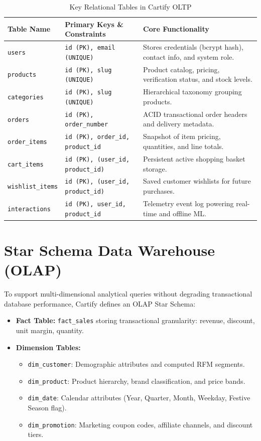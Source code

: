 \documentclass[12pt,a4paper,oneside]{report}
\begin{document}
\begin{table}[H]
\centering
\caption{Key Relational Tables in Cartify OLTP}
\begin{tabularx}{\textwidth}{l p{4cm} X}
\toprule
\textbf{Table Name} & \textbf{Primary Keys \& Constraints} & \textbf{Core Functionality} \\
\midrule
\texttt{users} & \texttt{id (PK), email (UNIQUE)} & Stores credentials (bcrypt hash), contact info, and system role. \\
\texttt{products} & \texttt{id (PK), slug (UNIQUE)} & Product catalog, pricing, verification status, and stock levels. \\
\texttt{categories} & \texttt{id (PK), slug (UNIQUE)} & Hierarchical taxonomy grouping products. \\
\texttt{orders} & \texttt{id (PK), order\_number} & ACID transactional order headers and delivery metadata. \\
\texttt{order\_items} & \texttt{id (PK), order\_id, product\_id} & Snapshot of item pricing, quantities, and line totals. \\
\texttt{cart\_items} & \texttt{id (PK), (user\_id, product\_id)} & Persistent active shopping basket storage. \\
\texttt{wishlist\_items} & \texttt{id (PK), (user\_id, product\_id)} & Saved customer wishlists for future purchases. \\
\texttt{interactions} & \texttt{id (PK), user\_id, product\_id} & Telemetry event log powering real-time and offline ML. \\
\bottomrule
\end{tabularx}
\end{table}

\section{Star Schema Data Warehouse (OLAP)}
To support multi-dimensional analytical queries without degrading transactional database performance, Cartify defines an OLAP Star Schema:
\begin{itemize}
    \item \textbf{Fact Table:} \texttt{fact\_sales} storing transactional granularity: revenue, discount, unit margin, quantity.
    \item \textbf{Dimension Tables:}
    \begin{itemize}
        \item \texttt{dim\_customer}: Demographic attributes and computed RFM segments.
        \item \texttt{dim\_product}: Product hierarchy, brand classification, and price bands.
        \item \texttt{dim\_date}: Calendar attributes (Year, Quarter, Month, Weekday, Festive Season flag).
        \item \texttt{dim\_promotion}: Marketing coupon codes, affiliate channels, and discount tiers.
    \end{itemize}
\end{itemize}
\end{document}
